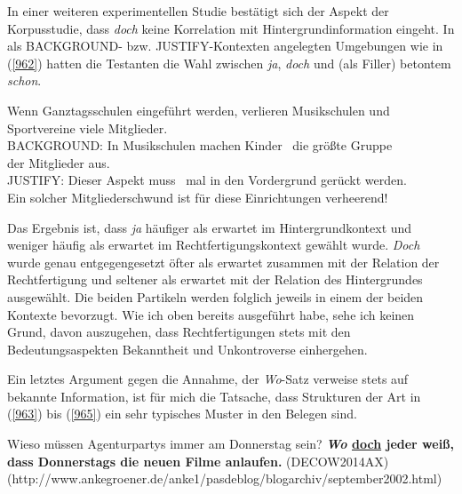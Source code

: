 {In einer weiteren experimentellen Studie bestätigt sich der Aspekt der Korpusstudie, dass \textit{doch} keine Korrelation mit Hintergrundinformation eingeht. In als BACKGROUND- bzw. JUSTIFY-Kontexten angelegten Umgebungen wie in (\ref{962}) hatten die Testanten die Wahl zwischen \textit{ja}, \textit{doch} und (als Filler) betontem \textit{schon}.

\begin{exe}
	\ex\label{962}
	Wenn Ganztagsschulen eingeführt werden, verlieren Musikschulen und Sportvereine viele Mitglieder.\\
	\newline
	\noindent
	BACKGROUND: In Musikschulen machen Kinder \hrulefill \ die größte Gruppe \\
	der Mitglieder aus.\\
	JUSTIFY: Dieser Aspekt muss \hrulefill  \ mal in 
	den Vordergrund gerückt werden.\\
	\newline
	\noindent
	Ein solcher Mitgliederschwund ist für diese Einrichtungen verheerend!	
	\newline
	\hbox{}\hfill\hbox{\citet[90-91]{Doering2014}}
\end{exe}		
Das Ergebnis ist, dass \textit{ja} häufiger als erwartet im Hintergrundkontext und weniger häufig als erwartet im Rechtfertigungskontext gewählt wurde. \textit{Doch} wurde genau entgegengesetzt öfter als erwartet zusammen mit der Relation der Rechtfertigung und seltener als erwartet mit der Relation des Hintergrundes ausgewählt. Die beiden Partikeln werden folglich jeweils in einem der beiden Kontexte bevorzugt. Wie ich oben bereits ausgeführt habe, sehe ich keinen Grund, davon auszugehen, dass Rechtfertigungen stets mit den Bedeutungsaspekten Bekanntheit und Unkontroverse einhergehen.
 
Ein letztes Argument gegen die Annahme, der \textit{Wo}-Satz verweise stets auf bekannte Information, ist für mich die Tatsache, dass Strukturen der Art in (\ref{963}) bis (\ref{965}) ein sehr typisches Muster in den Belegen sind.

\begin{exe}
	\ex\label{963}
	\scriptsize
	Wieso müssen Agenturpartys immer am Donnerstag sein? \textbf{\textit{Wo} \underline{doch} jeder weiß, dass Donnerstags die neuen Filme anlaufen.}	
	\hfill\hbox{(DECOW2014AX)}
	\newline
	\hbox{}\hfill\hbox{(http://www.ankegroener.de/anke1/pasdeblog/blogarchiv/september2002.html)}
\end{exe}

}

